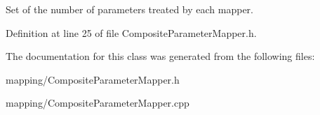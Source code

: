 Set of the number of parameters treated by each mapper. 

Definition at line 25 of file Composite\+Parameter\+Mapper.\+h.



The documentation for this class was generated from the following files\+:\begin{DoxyCompactItemize}
\item 
mapping/Composite\+Parameter\+Mapper.\+h\item 
mapping/Composite\+Parameter\+Mapper.\+cpp\end{DoxyCompactItemize}
